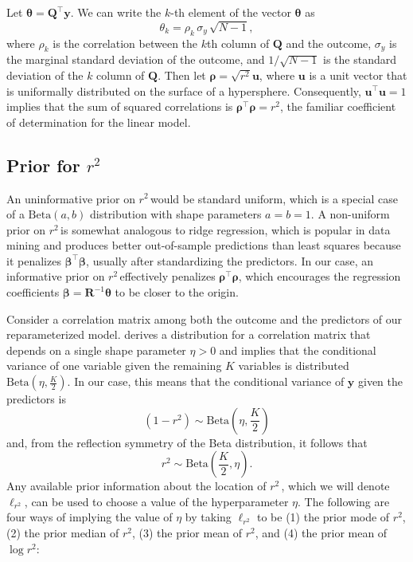 \documentclass[11pt]{article}
\newcommand{\Rsq}{$r^2\,$}
\newcommand{\boldrho}{\boldsymbol{\rho}}
\newcommand{\boldbeta}{\boldsymbol{\beta}}
\newcommand{\boldtheta}{\boldsymbol{\theta}}
\newcommand{\y}{\mathbf{y}}
\newcommand{\Q}{\mathbf{Q}}
\newcommand{\R}{\mathbf{R}}
\renewcommand{\u}{\mathbf{u}}
\newcommand{\locRsq}{\ell_{r^2}}
\newcommand{\halfK}{\frac{K}{2}}
\newcommand{\Betadist}[2]{\mathrm{Beta}\left(#1,#2\right)}
\begin{document}
Let $\boldtheta = \Q^\top \y$. We can write the $k$-th element of the vector
$\boldtheta$ as
$$\theta_k = \rho_k \, \sigma_y \, \sqrt{N - 1},$$
where $\rho_k$ is the correlation between the $k$th column of $\Q$ and the
outcome, $\sigma_y$ is the marginal standard deviation of the outcome, and
$1/\sqrt{N-1}$ is the standard deviation of the $k$ column of $\Q$. Then let
$\boldrho = \sqrt{r^2}\u$, where $\u$ is a unit vector that is
uniformally distributed on the surface of a hypersphere. Consequently,
$\u^\top \u = 1$ implies that the sum of squared correlations is
$\boldrho^\top \boldrho = r^2$, the familiar coefficient of determination for
the linear model.

\subsection{Prior for \Rsq}
\label{subsec:r2prior}
An uninformative prior on \Rsq would be standard uniform, which is a special
case of a $\Betadist{a}{b}$ distribution with shape parameters $a = b = 1$.
A non-uniform prior on \Rsq is somewhat analogous to ridge
regression, which is popular in data mining and produces better out-of-sample
predictions than least squares because it penalizes $\boldbeta^\top \boldbeta$,
usually after standardizing the predictors. In our case, an informative prior on
\Rsq effectively penalizes $\boldrho^\top \boldrho$, which encourages the
regression coefficients $\boldbeta = \R^{-1} \boldtheta$ to be closer to the
origin.

Consider a correlation matrix among both the outcome and the predictors of our
reparameterized model.  derives a distribution for a correlation
matrix that depends on a single shape parameter $\eta > 0$ and implies that the
conditional variance of one variable given the remaining $K$ variables is
distributed $\Betadist{\eta}{\halfK}$. In our case, this means that the
conditional variance of $\y$ given the predictors is
$$(1 - r^2) \sim \Betadist{\eta}{\halfK}$$
and, from the reflection symmetry of the Beta distribution, it follows that
$$r^2 \sim \Betadist{\halfK}{\eta}.$$
Any available prior information about the location of \Rsq, which we will denote
$\locRsq$, can be used to choose a value of the hyperparameter $\eta$. The
following are four ways of implying the value of $\eta$ by taking
$\locRsq$ to be (1) the prior mode of $r^2$, (2) the prior median of $r^2$,
(3) the prior mean of $r^2$, and (4) the prior mean of $\log{r^2}$:
\end{document}
